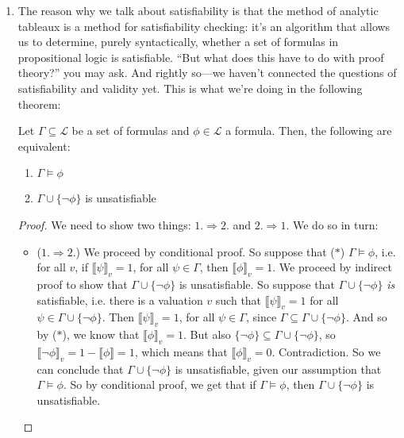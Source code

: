 \begin{enumerate}[\thesection.1]
\begin{enumerate}[(a)]
		\end{enumerate}
		
	\item The reason why we talk about satisfiability is that the method of analytic tableaux is a method for satisfiability checking: it's an algorithm that allows us to determine, purely syntactically, whether a set of formulas in propositional logic is satisfiable. ``But what does this have to do with proof theory?'' you may ask. And rightly so---we haven't connected the questions of satisfiability and validity yet. This is what we're doing in the following theorem:
			
			\begin{theorem}
			Let $\Gamma\subseteq\mathcal{L}$ be a set of formulas and $\phi\in\mathcal{L}$ a formula. Then, the following are equivalent:
			\begin{enumerate}[1.]
			
				\item $\Gamma\vDash\phi$
				
				\item $\Gamma\cup\{\neg\phi\}$ is unsatisfiable
			
			\end{enumerate}
			\end{theorem} 
			\begin{proof}
			We need to show two things: $1.\Rightarrow 2.$ and $2. \Rightarrow 1.$ We do so in turn:
			
			\begin{itemize}
			
				\item ($1.\Rightarrow 2.$) We proceed by conditional proof. So suppose that ($\ast$) $\Gamma\vDash \phi$, i.e. for all $v$, if $\llbracket \psi\rrbracket_v=1$, for all $\psi\in\Gamma$, then $\llbracket\phi\rrbracket_v=1$. We proceed by indirect proof to show that $\Gamma\cup\{\neg \phi\}$ is unsatisfiable. So suppose that $\Gamma\cup\{\neg \phi\}$ \emph{is} satisfiable, i.e. there is a valuation $v$ such that $\llbracket\psi\rrbracket_v=1$ for all $\psi\in\Gamma\cup\{\neg \phi\}$. Then $\llbracket\psi\rrbracket_v=1$, for all $\psi\in\Gamma$, since $\Gamma\subseteq \Gamma\cup\{\neg \phi\}$. And so by ($\ast$), we know that $\llbracket\phi\rrbracket_v=1$. But also $\{\neg\phi\}\subseteq \Gamma\cup\{\neg \phi\}$, so $\llbracket\neg\phi\rrbracket_v=1-\llbracket\phi\rrbracket=1$, which means that $\llbracket\phi\rrbracket_v=0$. Contradiction. So we can conclude that $\Gamma\cup\{\neg \phi\}$ is unsatisfiable, given our assumption that $\Gamma\vDash \phi$. So by conditional proof, we get that if $\Gamma\vDash\phi$, then $\Gamma\cup\{\neg\phi\}$ is unsatisfiable.
				

\end{itemize}
\end{proof}
\end{enumerate}
